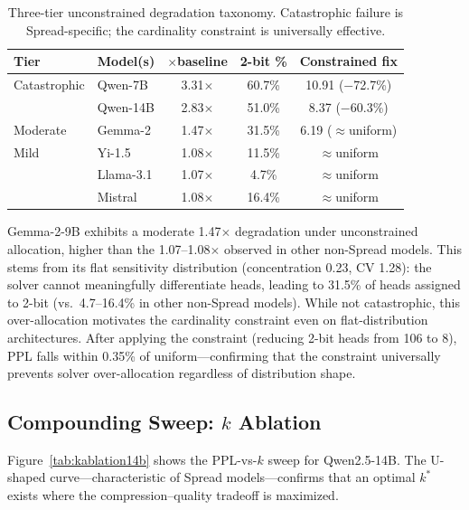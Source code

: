 \documentclass[11pt,a4paper]{article}
\begin{document}
\begin{table}[h]
\centering
\caption{Three-tier unconstrained degradation taxonomy. Catastrophic failure is Spread-specific; the cardinality constraint is universally effective.}
\label{tab:threetier}
\begin{tabular}{llccc}
\toprule
\textbf{Tier} & \textbf{Model(s)} & $\boldsymbol{\times}$\textbf{baseline} & \textbf{2-bit \%} & \textbf{Constrained fix} \\
\midrule
Catastrophic & Qwen-7B   & 3.31$\times$ & 60.7\% & 10.91 ($-$72.7\%) \\
             & Qwen-14B  & 2.83$\times$ & 51.0\% & 8.37 ($-$60.3\%)  \\
Moderate     & Gemma-2   & 1.47$\times$ & 31.5\% & 6.19 ($\approx$uniform) \\
Mild         & Yi-1.5    & 1.08$\times$ & 11.5\% & $\approx$uniform \\
             & Llama-3.1 & 1.07$\times$ & 4.7\%  & $\approx$uniform \\
             & Mistral   & 1.08$\times$ & 16.4\% & $\approx$uniform \\
\bottomrule
\end{tabular}
\end{table}

Gemma-2-9B exhibits a moderate 1.47$\times$ degradation under unconstrained allocation, higher than the 1.07--1.08$\times$ observed in other non-Spread models.
This stems from its flat sensitivity distribution (concentration 0.23, CV 1.28): the solver cannot meaningfully differentiate heads, leading to 31.5\% of heads assigned to 2-bit (vs.\ 4.7--16.4\% in other non-Spread models).
While not catastrophic, this over-allocation motivates the cardinality constraint even on flat-distribution architectures.
After applying the constraint (reducing 2-bit heads from 106 to 8), PPL falls within 0.35\% of uniform---confirming that the constraint universally prevents solver over-allocation regardless of distribution shape.

\subsection{Compounding Sweep: $k$ Ablation}
\label{sec:kablation}

Figure~\ref{tab:kablation14b} shows the PPL-vs-$k$ sweep for Qwen2.5-14B.
The U-shaped curve---characteristic of Spread models---confirms that an optimal $k^*$ exists where the compression--quality tradeoff is maximized.
\end{document}
